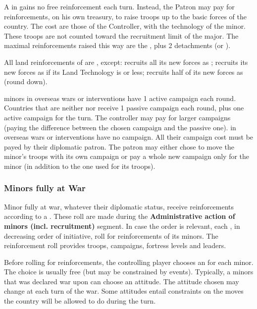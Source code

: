 \bparag A \MIN in \VASSAL gains no free reinforcement each turn.
\bparag Instead, the Patron may pay for reinforcements, on his own treasury,
to raise troops up to the basic forces of the country.
\bparag The cost are those of the Controller, with the technology of the
minor.
\bparag These troops are not counted toward the recruitment limit of the
major.
\bparag The maximal reinforcements raised this way are the , plus 2 detachments (\LD or \ND).

\aparag[Moral]
\bparag All land reinforcements of \MIN are , except:
\bparag \paysSuede recruits all its new forces as ;
\bparag \paysSuisse recruits its new forces as  if its Land
Technology is \TMUS or less;
\bparag \paysPerse recruits half of its new forces as  (round
down).

\aparag[Campaigns]
\bparag \Neutral minors in overseas wars or interventions have 1 active campaign
each round.
\bparag Countries that are neither \Neutral nor \VASSAL receive 1 passive
campaign each round, plus one active campaign for the turn. The controller may
pay for larger campaigns (paying the difference between the chosen campaign
and the passive one).
\bparag \VASSAL in overseas wars or interventions have no campaign. All their
campaign cost must be payed by their diplomatic patron. The patron may either
chose to move the minor's troops with its own campaign or pay a whole new
campaign only for the minor (in addition to the one used for its troops).

\subsubsection{Minors fully at War}
\aparag[Generalities]
\bparag Minor fully at war, whatever their diplomatic status, receive
reinforcements according to a .
\bparag These roll are made during the \textbf{Administrative action of minors
  (incl. recruitment)} segment.
\bparag In case the order is relevant, each \MAJ, in decreasing order of
initiative, roll for reinforcements of its minors.
\bparag The reinforcement roll provides troops, campaigns, fortress levels and
leaders.

\aparag[Attitude]
\bparag Before rolling for reinforcements, the controlling player chooses an
 for each minor.
\bparag The choice is usually free (but may be constrained by
events). Typically, a minors that was declared war upon can choose an
 attitude.
\bparag The attitude chosen may change at each turn of the war.
\bparag Some attitudes entail constraints on the moves the country will be
allowed to do during the turn.

